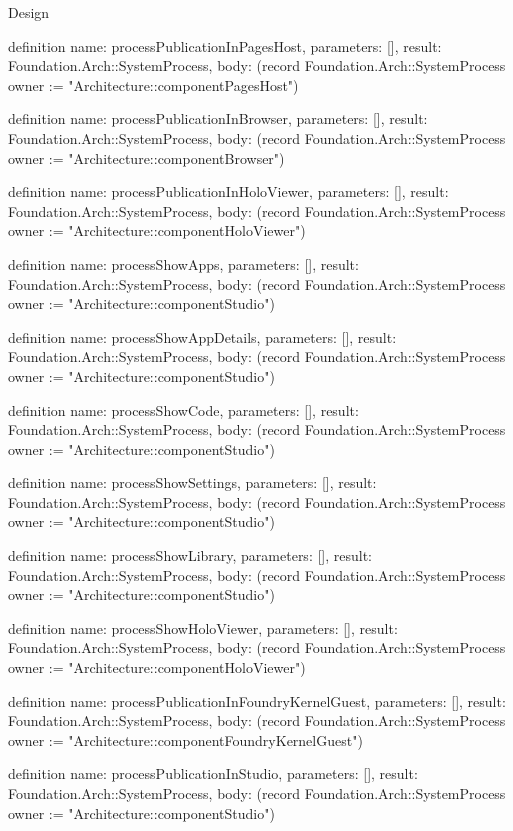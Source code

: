 \begin{lexlean}{Design}
\begin{semanticmodule}
definition{
  name: processPublicationInPagesHost,
  parameters: [],
  result: Foundation.Arch::SystemProcess,
  body: (record Foundation.Arch::SystemProcess {owner := "Architecture::componentPagesHost"})
}

definition{
  name: processPublicationInBrowser,
  parameters: [],
  result: Foundation.Arch::SystemProcess,
  body: (record Foundation.Arch::SystemProcess {owner := "Architecture::componentBrowser"})
}

definition{
  name: processPublicationInHoloViewer,
  parameters: [],
  result: Foundation.Arch::SystemProcess,
  body: (record Foundation.Arch::SystemProcess {owner := "Architecture::componentHoloViewer"})
}

definition{
  name: processShowApps,
  parameters: [],
  result: Foundation.Arch::SystemProcess,
  body: (record Foundation.Arch::SystemProcess {owner := "Architecture::componentStudio"})
}

definition{
  name: processShowAppDetails,
  parameters: [],
  result: Foundation.Arch::SystemProcess,
  body: (record Foundation.Arch::SystemProcess {owner := "Architecture::componentStudio"})
}

definition{
  name: processShowCode,
  parameters: [],
  result: Foundation.Arch::SystemProcess,
  body: (record Foundation.Arch::SystemProcess {owner := "Architecture::componentStudio"})
}

definition{
  name: processShowSettings,
  parameters: [],
  result: Foundation.Arch::SystemProcess,
  body: (record Foundation.Arch::SystemProcess {owner := "Architecture::componentStudio"})
}

definition{
  name: processShowLibrary,
  parameters: [],
  result: Foundation.Arch::SystemProcess,
  body: (record Foundation.Arch::SystemProcess {owner := "Architecture::componentStudio"})
}

definition{
  name: processShowHoloViewer,
  parameters: [],
  result: Foundation.Arch::SystemProcess,
  body: (record Foundation.Arch::SystemProcess {owner := "Architecture::componentHoloViewer"})
}

definition{
  name: processPublicationInFoundryKernelGuest,
  parameters: [],
  result: Foundation.Arch::SystemProcess,
  body: (record Foundation.Arch::SystemProcess {owner := "Architecture::componentFoundryKernelGuest"})
}

definition{
  name: processPublicationInStudio,
  parameters: [],
  result: Foundation.Arch::SystemProcess,
  body: (record Foundation.Arch::SystemProcess {owner := "Architecture::componentStudio"})
}


\end{semanticmodule}
\end{lexlean}
